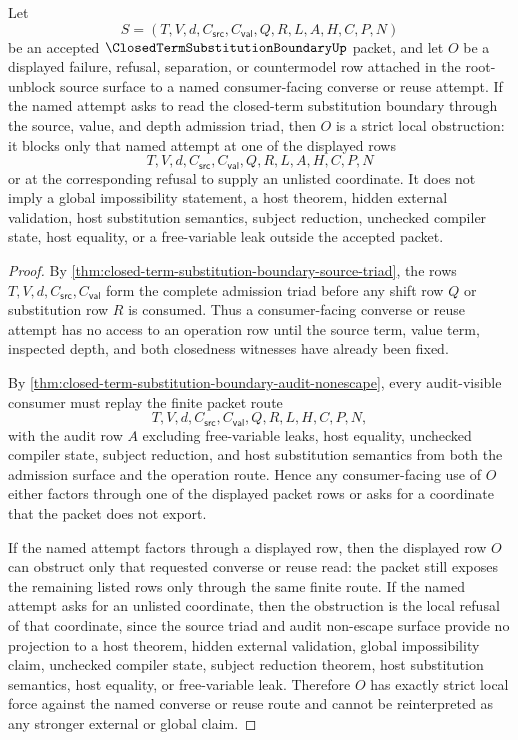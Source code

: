 \begin{corollary}
\label{cor:closed-term-substitution-boundary-source-triad-strict-obstruction}
Let
$$
S=(T,V,d,C_{\mathsf{src}},C_{\mathsf{val}},Q,R,L,A,H,C,P,N)
$$
be an accepted $\ClosedTermSubstitutionBoundaryUp$ packet, and let $O$ be a displayed failure, refusal, separation, or countermodel row attached in the root-unblock source surface to a named consumer-facing converse or reuse attempt. If the named attempt asks to read the closed-term substitution boundary through the source, value, and depth admission triad, then $O$ is a strict local obstruction: it blocks only that named attempt at one of the displayed rows
$$
T,V,d,C_{\mathsf{src}},C_{\mathsf{val}},Q,R,L,A,H,C,P,N
$$
or at the corresponding refusal to supply an unlisted coordinate. It does not imply a global impossibility statement, a host theorem, hidden external validation, host substitution semantics, subject reduction, unchecked compiler state, host equality, or a free-variable leak outside the accepted packet.
\end{corollary}
\begin{proof}
By \autoref{thm:closed-term-substitution-boundary-source-triad}, the rows $T,V,d,C_{\mathsf{src}},C_{\mathsf{val}}$ form the complete admission triad before any shift row $Q$ or substitution row $R$ is consumed. Thus a consumer-facing converse or reuse attempt has no access to an operation row until the source term, value term, inspected depth, and both closedness witnesses have already been fixed.

By \autoref{thm:closed-term-substitution-boundary-audit-nonescape}, every audit-visible consumer must replay the finite packet route
$$
T,V,d,C_{\mathsf{src}},C_{\mathsf{val}},Q,R,L,H,C,P,N,
$$
with the audit row $A$ excluding free-variable leaks, host equality, unchecked compiler state, subject reduction, and host substitution semantics from both the admission surface and the operation route. Hence any consumer-facing use of $O$ either factors through one of the displayed packet rows or asks for a coordinate that the packet does not export.

If the named attempt factors through a displayed row, then the displayed row $O$ can obstruct only that requested converse or reuse read: the packet still exposes the remaining listed rows only through the same finite route. If the named attempt asks for an unlisted coordinate, then the obstruction is the local refusal of that coordinate, since the source triad and audit non-escape surface provide no projection to a host theorem, hidden external validation, global impossibility claim, unchecked compiler state, subject reduction theorem, host substitution semantics, host equality, or free-variable leak. Therefore $O$ has exactly strict local force against the named converse or reuse route and cannot be reinterpreted as any stronger external or global claim.
\end{proof}
